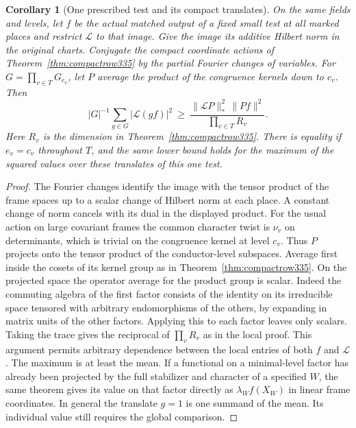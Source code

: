 \documentclass[a4paper,11pt]{article}
\newtheorem{corollary}[proposition]{Corollary}
\theoremstyle{definition}
\theoremstyle{remark}
\numberwithin{equation}{section}
\begin{document}
\begin{corollary}[One prescribed test and its compact translates]\label{cor:compactglobal335}
On the same fields and levels, let \(f\) be the actual matched output
of a fixed small test at all marked places and restrict \(\mathcal L\)
to that image. Give the image its additive Hilbert norm in the original
charts. Conjugate the compact coordinate actions of
Theorem~\ref{thm:compactrow335} by the partial Fourier changes of variables.
For \(G=\prod_{v\in T}G_{e_v}\), let \(P\) average the product of the
congruence kernels down to \(c_v\). Then
\[
   |G|^{-1}\sum_{g\in G}|\mathcal L(g f)|^2
       \ \ge\
   \frac{\|\mathcal L P\|_*^2\,\|P f\|^2}{\prod_{v\in T}R_v}.
\]
Here \(R_v\) is the dimension in Theorem~\ref{thm:compactrow335}.
There is equality if \(e_v=c_v\) throughout \(T\), and the same
lower bound holds for the maximum of the squared values over these
translates of this one test.
\end{corollary}
\begin{proof}
The Fourier changes identify the image with the tensor product of
the frame spaces up to a scalar change of Hilbert norm at each place.
A constant change of norm cancels with its dual in the displayed
product. For the usual action on large covariant frames the common
character twist is \(\nu_v\) on determinants, which is trivial on
the congruence kernel at level \(c_v\). Thus \(P\) projects onto
the tensor product of the conductor-level subspaces. Average first
inside the cosets of its kernel group as in Theorem~\ref{thm:compactrow335}.
On the projected space the operator average for the product group
is scalar. Indeed the commuting algebra of the first factor consists
of the identity on its irreducible space tensored with arbitrary
endomorphisms of the others, by expanding in matrix units of the other
factors. Applying this to each factor leaves only scalars. Taking
the trace gives the reciprocal of \(\prod_v R_v\) as in the local
proof. This argument permits arbitrary dependence between the local
entries of both \(f\) and \(\mathcal L\). The maximum is at least the
mean. If a functional on a minimal-level factor has already been projected
by the full stabilizer and character of a specified \(W\), the same
theorem gives its value on that factor directly as \(\lambda_W f(X_W)\)
in linear frame coordinates. In general the translate \(g=1\) is one
summand of the mean. Its individual value still requires the global
comparison.
\end{proof}
\end{document}
